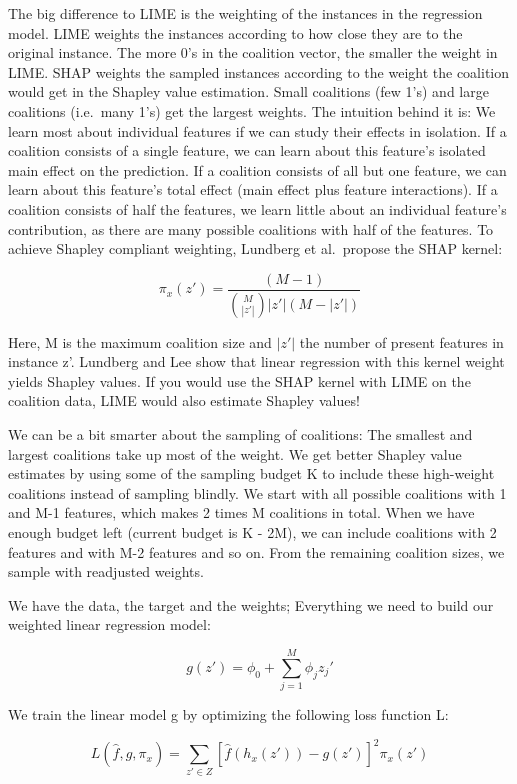 \documentclass[
  10pt,
]{scrbook}
\begin{document}
The big difference to LIME is the weighting of the instances in the regression model.
LIME weights the instances according to how close they are to the original instance.
The more 0's in the coalition vector, the smaller the weight in LIME.
SHAP weights the sampled instances according to the weight the coalition would get in the Shapley value estimation.
Small coalitions (few 1's) and large coalitions (i.e.~many 1's) get the largest weights.
The intuition behind it is:
We learn most about individual features if we can study their effects in isolation.
If a coalition consists of a single feature, we can learn about this feature's isolated main effect on the prediction.
If a coalition consists of all but one feature, we can learn about this feature's total effect (main effect plus feature interactions).
If a coalition consists of half the features, we learn little about an individual feature's contribution, as there are many possible coalitions with half of the features.
To achieve Shapley compliant weighting, Lundberg et al.~propose the SHAP kernel:

\[\pi_{x}(z')=\frac{(M-1)}{\binom{M}{|z'|}|z'|(M-|z'|)}\]

Here, M is the maximum coalition size and \(|z'|\) the number of present features in instance z'.
Lundberg and Lee show that linear regression with this kernel weight yields Shapley values.
If you would use the SHAP kernel with LIME on the coalition data, LIME would also estimate Shapley values!

We can be a bit smarter about the sampling of coalitions:
The smallest and largest coalitions take up most of the weight.
We get better Shapley value estimates by using some of the sampling budget K to include these high-weight coalitions instead of sampling blindly.
We start with all possible coalitions with 1 and M-1 features, which makes 2 times M coalitions in total.
When we have enough budget left (current budget is K - 2M), we can include coalitions with 2 features and with M-2 features and so on.
From the remaining coalition sizes, we sample with readjusted weights.

We have the data, the target and the weights;
Everything we need to build our weighted linear regression model:

\[g(z')=\phi_0+\sum_{j=1}^M\phi_jz_j'\]

We train the linear model g by optimizing the following loss function L:

\[L(\hat{f},g,\pi_{x})=\sum_{z'\in{}Z}[\hat{f}(h_x(z'))-g(z')]^2\pi_{x}(z')\]
\end{document}
